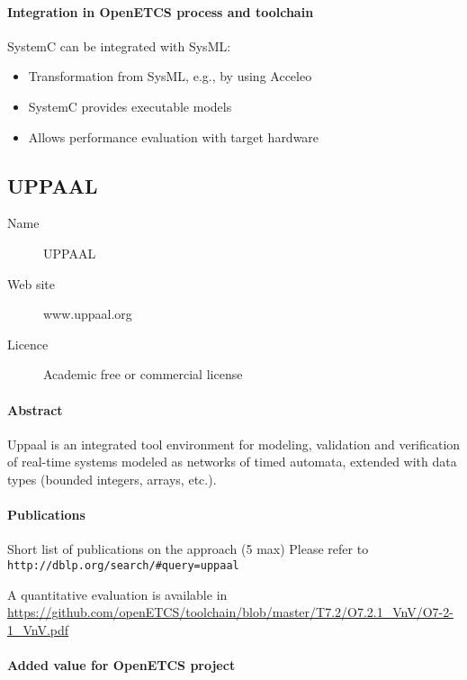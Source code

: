 \paragraph{Integration in OpenETCS process and toolchain}

SystemC can be integrated with SysML:

\begin{itemize}
\item Transformation from SysML, e.g., by using Acceleo
\item SystemC provides executable models
\item Allows performance evaluation with target hardware
\end{itemize}

\subsection{UPPAAL}
\label{sec: UPPAALL}

\begin{description}
\item[Name] UPPAAL
\item[Web site] www.uppaal.org
\item[Licence] Academic free or commercial license
\end{description}

\paragraph{Abstract} Uppaal is an integrated tool environment for modeling, validation and verification of real-time systems modeled as networks of timed automata, extended with data types (bounded integers, arrays, etc.).

\paragraph{Publications} Short list of publications on the approach (5 max)
Please refer to \verb|http://dblp.org/search/#query=uppaal|



A quantitative evaluation is available in \url{https://github.com/openETCS/toolchain/blob/master/T7.2/O7.2.1_VnV/O7-2-1_VnV.pdf}


\paragraph{Added value for OpenETCS project}

